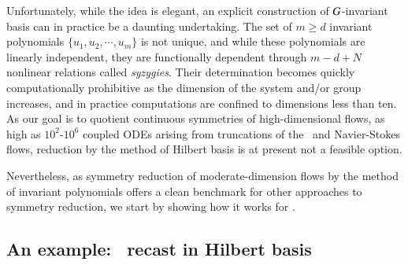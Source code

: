 \documentclass[preprint,number,sort&compress]{elsarticle}
\begin{document}
Unfortunately, while the idea is elegant, an explicit
construction of $G${-in\-vari\-ant} basis can in
practice be a daunting undertaking. The set  of $m \geq d$
in\-vari\-ant polynomials $\{u_1,u_2,\cdots,u_m\}$ is not
unique, and while these polynomials are linearly independent,
they are functionally dependent through $m-d+N$ nonlinear
relations called \emph{syzygies}. Their determination becomes
quickly computationally prohibitive as the dimension of the
system and/or group increases,
and in practice computations are confined to
dimensions less than ten. As our goal is to quotient
continuous symmetries of high-dimensional flows, as high as
$10^2$-$10^6$ coupled ODEs arising from
truncations of the \KS\ and Navier-Stokes flows, reduction by
the method of Hilbert basis is at present not a feasible
option.

Nevertheless, as symmetry reduction of moderate-dimension
flows by the method of in\-vari\-ant polynomials offers a clean
benchmark for other approaches to symmetry reduction, we start
by showing how it works for \cLf.


\subsection{\label{s:cLeHilbert} An example: \CLe\ recast in Hilbert basis}
\end{document}
